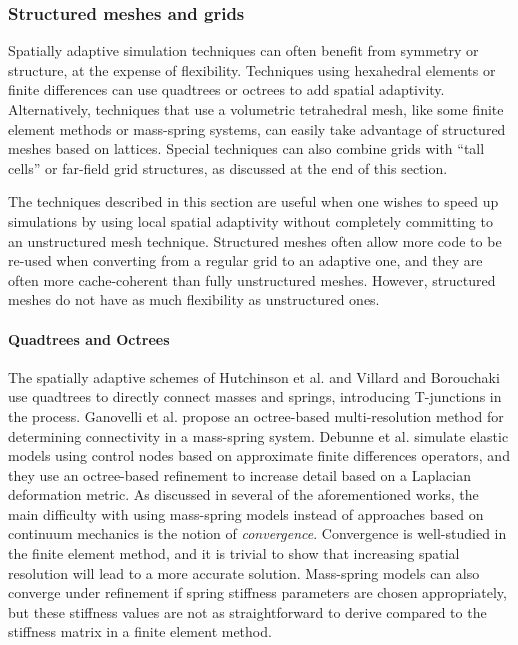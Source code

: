 \subsubsection{Structured meshes and grids}

\label{sec:structured}
Spatially adaptive simulation techniques can often benefit from symmetry or structure, at the expense of flexibility. Techniques using hexahedral elements or finite differences can use quadtrees or octrees to add spatial adaptivity. Alternatively, techniques that use a volumetric tetrahedral mesh, like some finite element methods or mass-spring systems, can easily take advantage of structured meshes based on lattices. Special techniques can also combine grids with ``tall cells'' or far-field grid structures, as discussed at the end of this section.

The techniques described in this section are useful when one wishes to speed up simulations by using local spatial adaptivity without completely committing to an unstructured mesh technique. Structured meshes often allow more code to be re-used when converting from a regular grid to an adaptive one, and they are often more cache-coherent than fully unstructured meshes. However, structured meshes do not have as much flexibility as unstructured ones.

\paragraph*{Quadtrees and Octrees}
The spatially adaptive schemes of Hutchinson et al. \cite{Hutchinson1996} and Villard and Borouchaki \cite{Villard2005} use quadtrees to directly connect masses and springs, introducing T-junctions in the process. Ganovelli et al. \cite{Ganovelli1999} propose an octree-based multi-resolution method for determining connectivity in a mass-spring system. Debunne et al. \cite{Debunne1999} simulate elastic models using control nodes based on approximate finite differences operators, and they use an octree-based refinement to increase detail based on a Laplacian deformation metric. As discussed in several of the aforementioned works, the main difficulty with using mass-spring models instead of approaches based on continuum mechanics is the notion of {\em convergence}. Convergence is well-studied in the finite element method, and it is trivial to show that increasing spatial resolution will lead to a more accurate solution. Mass-spring models can also converge under refinement if spring stiffness parameters are chosen appropriately, but these stiffness values are not as straightforward to derive compared to the stiffness matrix in a finite element method.

